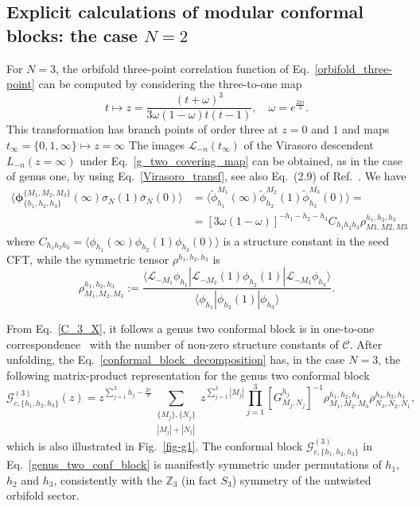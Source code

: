 \documentclass[a4paper,11pt]{article}
\begin{document}
\subsection{Explicit calculations of modular conformal blocks: the case $N=2$}

For $N=3$, the orbifold three-point correlation 
function of Eq.~\eqref{orbifold_three-point} can be computed 
by considering the three-to-one map~\cite{Collier}
\begin{equation}\label{g_two_covering_map}
 t\mapsto z =\frac{(t+\omega)^3}{3\omega(1-\omega)t(t-1)},\quad \omega=e^{\frac{2\pi i}{3}}.
\end{equation}
This transformation has branch points of order three at 
$z=0$ and $1$ and maps $t_{\infty}=\{0, 1, \infty\} \mapsto z=\infty$ 
The images $\mathcal{L}_{-n}(t_{\infty})$ of the Virasoro descendent $L_{-n}(z=\infty)$ 
under Eq.~\eqref{g_two_covering_map} can be obtained, as in the 
case of genus one, by using Eq.~\eqref{Virasoro_transf}, see also Eq.~(2.9)
of Ref.~\cite{Collier}. We have 
\begin{align}\label{C_3_X}
 \langle \boldsymbol{\phi}^{\{M_1,M_2,M_3\}}_{\{h_1,h_2,h_3\}}(\infty) \sigma_{N}(1)\bar{\sigma}_{N}(0)\rangle &=\langle \tilde{\phi}_{h_1}^{M_1} (\infty) \tilde{\phi}_{h_2}^{M_2}(1) \tilde{\phi}_{h_3}^{M_3}(0)\rangle
 = \\
 &=[3\omega(1-\omega)]^{-h_1-h_2-h_3}C_{h_1h_2h_3}\rho_{M1,M2,M3}^{h_1,h_2,h_3}
\end{align}
where $C_{h_1 h_2 h_3}=\langle \phi_{h_1}(\infty)\phi_{h_2}(1)\phi_{h_3}(0)\rangle$ is a structure constant in the seed CFT, while the symmetric tensor $\rho^{h_1,h_2,h_3}$ is 
\begin{equation}
\label{rho2}
 \rho^{h_1,h_2,h_3}_{M_1,M_2,M_3}:=
 \frac{\langle \mathcal{L}_{-M_1}\phi_{h_1}|\mathcal{L}_{-M_2}(1)\phi_{h_2}(1)|\mathcal{L}_{-M_3}\phi_{h_3}\rangle}
 { \langle \phi_{h_1}|\phi_{h_2}(1)|\phi_{h_3}\rangle}.
\end{equation}

From Eq.~\eqref{C_3_X}, it follows a genus two conformal block is in one-to-one correspondence~\cite{Cardy, Collier} with the number of non-zero structure constants of $\mathcal{C}$.
After unfolding, the Eq.~\eqref{conformal_block_decomposition} has, in the case $N=3$, the  following matrix-product representation
for the genus two conformal block \cite{Collier}
\begin{equation}\label{genus_two_conf_block}
 \mathcal{G}_{c, \{h_1, h_2, h_3\}}^{(3)}(z)=
z^{\sum_{j=1}^3 h_j-\frac{2c}{9}}\sum_{\substack{\{M_j\}, \{N_j\}\\|M_j|+|N_j|}}
 z^{\sum\limits_{j=1}^3 |M_j|}
 \prod_{j=1}^3 [G_{M_j,N_j}^{h_j}]^{-1}
 \rho^{h_1,h_2,h_3}_{M_1,M_2,M_3}\rho_{N_3,N_2,N_1}^{h_3,h_2,h_1},
\end{equation}
which is also illustrated in Fig.~\ref{fig-g1}.
The conformal block $\mathcal{G}_{c, \{h_1, h_2, h_3\}}^{(3)}$ in Eq.~\eqref{genus_two_conf_block} is
manifestly symmetric under permutations of $h_1$, $h_2$ and $h_3$, consistently with the $\mathbb Z_3$ (in fact $S_3$) symmetry of the untwisted orbifold sector.
\end{document}
